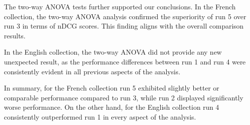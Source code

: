 The two-way \ac{ANOVA} tests further supported our conclusions. 
In the French collection, the two-way \ac{ANOVA} analysis confirmed the superiority of run 5 over run 3 in terms of \ac{nDCG} scores. 
This finding aligns with the overall comparison results. 

In the English collection, the two-way \ac{ANOVA} did not provide any new unexpected result, as the performance differences between run 1 and run 4 were consistently evident in all previous aspects of the analysis.

In summary, for the French collection run 5 exhibited slightly better or comparable performance compared to run 3, while run 2 displayed significantly worse performance. 
On the other hand, for the English collection run 4 consistently outperformed run 1 in every aspect of the analysis.

































